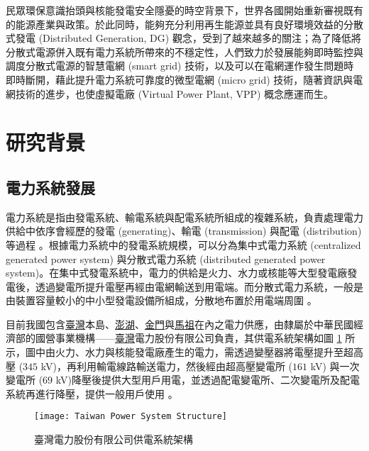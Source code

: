 民眾環保意識抬頭與核能發電安全隱憂的時空背景下，世界各國開始重新審視既有的能源產業與政策。於此同時，能夠充分利用再生能源並具有良好環境效益的分散式發電 (Distributed Generation, DG) 觀念，受到了越來越多的關注；為了降低將分散式電源併入既有電力系統所帶來的不穩定性，人們致力於發展能夠即時監控與調度分散式電源的智慧電網 (smart grid) 技術，以及可以在電網運作發生問題時即時斷開，藉此提升電力系統可靠度的微型電網 (micro grid) 技術，隨著資訊與電網技術的進步，也使虛擬電廠 (Virtual Power Plant, VPP) 概念應運而生。

\section{研究背景}

\subsection{電力系統發展}

電力系統是指由發電系統、輸電系統與配電系統所組成的複雜系統，負責處理電力供給中依序會經歷的發電 (generating)、輸電 (transmission) 與配電 (distribution) 等過程 \cite{gonen2015electric}。根據電力系統中的發電系統規模，可以分為集中式電力系統 (centralized generated power system) 與分散式電力系統 (distributed generated power system)。在集中式發電系統中，電力的供給是火力、水力或核能等大型發電廠發電後，透過變電所提升電壓再經由電網輸送到用電端。而分散式電力系統，一般是由裝置容量較小的中小型發電設備所組成，分散地布置於用電端周圍 \cite{nissen2009high}。

目前我國包含\uline{臺灣}本島、\uline{澎湖}、\uline{金門}與\uline{馬祖}在內之電力供應，由隸屬於中華民國經濟部的國營事業機構------\uline{臺灣}電力股份有限公司負責，其供電系統架構如圖 \ref{figure: Taiwan Power System Structure} 所示，圖中由火力、水力與核能發電廠產生的電力，需透過變壓器將電壓提升至超高壓 ($345$ \si{\kV})，再利用輸電線路輸送電力，然後經由超高壓變電所 ($161$ \si{\kV}) 與一次變電所 ($69$ \si{\kV})降壓後提供大型用戶用電，並透過配電變電所、二次變電所及配電系統再進行降壓，提供一般用戶使用 \cite{taipower2019supply}。

\begin{figure}[htbp]
  \centering
  \texttt{[image: Taiwan Power System Structure]}
  \caption[臺灣電力股份有限公司供電系統架構]{臺灣電力股份有限公司供電系統架構 \cite{taipower2019supply}}
  \label{figure: Taiwan Power System Structure}
\end{figure}

